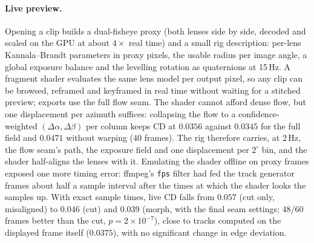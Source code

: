 \documentclass[11pt]{article}
\begin{document}
\paragraph{Live preview.} Opening a clip builds a dual-fisheye proxy (both lenses side by side, decoded and scaled on the GPU at about $4\times$ real time) and a small rig description: per-lens Kannala--Brandt parameters in proxy pixels, the usable radius per image angle, a global exposure balance and the levelling rotation as quaternions at 15\,Hz. A fragment shader evaluates the same lens model per output pixel, so any clip can be browsed, reframed and keyframed in real time without waiting for a stitched preview; exports use the full flow seam. The shader cannot afford dense flow, but one displacement per azimuth suffices: collapsing the flow to a confidence-weighted $(\Delta\alpha,\Delta\beta)$ per column keeps CD at $0.0356$ against $0.0345$ for the full field and $0.0471$ without warping (40 frames). The rig therefore carries, at 2\,Hz, the flow seam's path, the exposure field and one displacement per $2^\circ$ bin, and the shader half-aligns the lenses with it. Emulating the shader offline on proxy frames exposed one more timing error: ffmpeg's \texttt{fps} filter had fed the track generator frames about half a sample interval after the times at which the shader looks the samples up. With exact sample times, live CD falls from $0.057$ (cut only, misaligned) to $0.046$ (cut) and $0.039$ (morph, with the final seam settings; 48/60 frames better than the cut, $p=2\times10^{-7}$), close to tracks computed on the displayed frame itself ($0.0375$), with no significant change in edge deviation.
\end{document}
